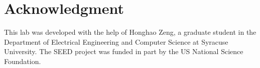 \section*{Acknowledgment} 

This lab was developed with the help of Honghao Zeng, 
a graduate student in the Department of Electrical Engineering 
and Computer Science at Syracuse University. 
The SEED project was funded in part 
by the US National Science Foundation. 







